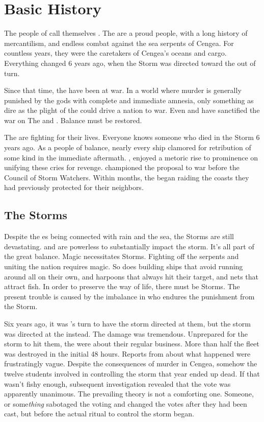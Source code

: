 \documentclass[blue]{GL2020}
\begin{document}
\name{\bVikings{}}

\section*{Basic History}
The people of \pShip{} call themselves \pShippies{}. The \pShippies{} are a proud people, with a long history of mercantilism, and endless combat against the sea serpents of Cengea. For countless years, they were the caretakers of Cengea's oceans and cargo. Everything changed 6 years ago, when the Storm was directed toward the \pShip{} out of turn.

Since that time, the \pShip{} have been at war. In a world where murder is generally punished by the gods with complete and immediate amnesia, only something as dire as the plight of the \pShippies{} could drive a nation to war. Even \cEbbFull{} and \cFlowFull{} have sanctified the war on The \pFarm{} and \pTech{}. Balance must be restored.

The \pShip{} are fighting for their lives. Everyone knows someone who died in the Storm 6 years ago. As a people of balance, nearly every ship clamored for  retribution of some kind in the immediate aftermath. \cLoud{\full}, enjoyed a metoric rise to prominence on unifying these cries for revenge. \cLoud{\They} championed the proposal to war before the Council of Storm Watchers. Within months, the \pShip{} began raiding the coasts they had previously protected for their neighbors.

\subsection*{The Storms}
Despite the \pShip{} \cEbb{\God}es being connected with rain and the sea, the Storms are still devastating. \cEbb{} and \cFlow{} are powerless to substantially impact the storm. It's all part of the great balance. Magic necessitates Storms. Fighting off the serpents and uniting the \pShip{} nation requires magic. So does building ships that avoid running around all on their own, and harpoons that always hit their target, and nets that attract fish. In order to preserve the \pShip{} way of life, there must be Storms. The present trouble is caused by the imbalance in who endures the punishment from the Storm.

Six years ago, it was \pTech{}'s turn to have the storm directed at them, but the storm was directed at the \pShip{} instead. The damage was tremendous. Unprepared for the storm to hit them, the \pShippies{} were about their regular business. More than half the fleet was destroyed in the initial 48 hours. Reports from \pSchool{} about what happened were frustratingly vague. Despite the consequences of murder in Cengea, somehow the twelve students involved in controlling the storm that year ended up dead. If that wasn't fishy enough, subsequent investigation revealed that the vote was apparently unanimous. The prevailing theory is not a comforting one. Someone, or some\emph{thing} sabotaged the voting and changed the votes after they had been cast, but before the actual ritual to control the storm began.
\end{document}
